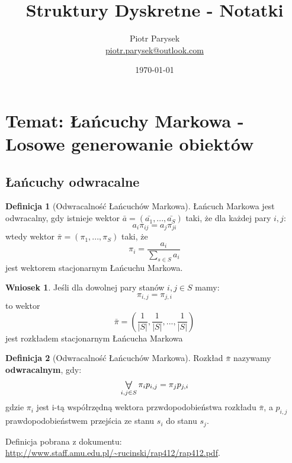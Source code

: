 \documentclass[a4paper,12pt]{article}
\title{Struktury Dyskretne - Notatki}
\author{Piotr Parysek\\
\href{mailto:piotr.parysek@outlook.com}{piotr.parysek@outlook.com} }
\date{\today}
\theoremstyle{definition}%
\newtheorem{remark}{Wniosek}%
\theoremstyle{definition}
\newtheorem{definition}{Definicja}%
\theoremstyle{problem}
\let\originalforall=\forall%
\renewcommand{\forall}{\mathop{\vcenter{\hbox{\Large$\originalforall$}}}}
\begin{document}
\maketitle

\tableofcontents
\section[Wykład 9: 4-V-2017 - Temat: Łańcuchy Markowa - Losowe generowanie obiektów]{Temat: Łańcuchy Markowa - Losowe generowanie obiektów}
\subsection{Łańcuchy odwracalne}
\begin{definition}[Odwracalność Łańcuchów Markowa]\label{def:OdwracalnoscLM}
Łańcuch Markowa jest odwracalny, gdy istnieje wektor $\bar{a}=(\bar{a_1}, ..., \bar{a_S})$ taki, że dla każdej pary $i,j$: $$a_i\pi _{ij}=a_j\pi _{ji}$$  wtedy wektor $\bar{\pi}=(\pi _1,...,\pi _S)$ taki, że $$\pi _i=\frac{a_i}{\sum _{s\in S}a_i}$$ jest wektorem stacjonarnym Łańcuchu Markowa.
\end{definition}
\begin{remark}
Jeśli dla dowolnej pary stanów $i,j\in S$ mamy: $$\pi_{i,j}=\pi_{j,i}$$ to wektor $$\bar{\pi}=\left(\frac{1}{|S|},\frac{1}{|S|},...,\frac{1}{|S|}\right)$$ jest rozkładem stacjonarnym Łańcucha Markowa
\end{remark}
\begin{definition}[Odwracalność Łańcuchów Markowa]\label{def:OdwracalnoscLM2}
Rozkład $\bar{\pi}$ nazywamy \textbf{odwracalnym}, gdy: $$\forall _{i,j\in S} \pi _i p_{i,j}=\pi _j p_{j,i}$$ gdzie $\pi _i$ jest i-tą współrzędną wektora przwdopodobieństwa rozkładu $\bar{\pi}$, a $p_{i,j}$ prawdopodobieństwem przejścia ze stanu $s_i$ do stanu $s_j$.

Definicja pobrana z dokumentu: \url{http://www.staff.amu.edu.pl/~rucinski/rap412/rap412.pdf}.
\end{definition}
\end{document}
